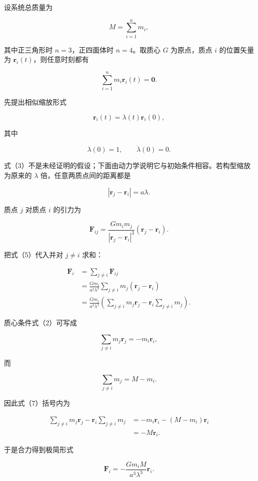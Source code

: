 \documentclass[12pt,a4paper,UTF8]{ctexart}
\begin{document}
设系统总质量为

\[
M=\sum_{i=1}^{n}m_i, \tag{1}
\]

其中正三角形时 \(n=3\)，正四面体时 \(n=4\)。取质心 \(G\) 为原点，质点
\(i\) 的位置矢量为 \(\boldsymbol r_i(t)\)，则任意时刻都有

\[
\sum_{i=1}^{n}m_i\boldsymbol r_i(t)=\boldsymbol0. \tag{2}
\]

先提出相似缩放形式

\[
\boldsymbol r_i(t)=\lambda(t)\boldsymbol r_i(0), \tag{3}
\]

其中

\[
\lambda(0)=1,\qquad \dot\lambda(0)=0. \tag{4}
\]

式（3）不是未经证明的假设；下面由动力学说明它与初始条件相容。若构型缩放为原来的
\(\lambda\) 倍，任意两质点间的距离都是

\[
|\boldsymbol r_j-\boldsymbol r_i|=a\lambda. \tag{5}
\]

质点 \(j\) 对质点 \(i\) 的引力为

\[
\boldsymbol F_{ij}
=\frac{Gm_im_j}{|\boldsymbol r_j-\boldsymbol r_i|^3}
(\boldsymbol r_j-\boldsymbol r_i). \tag{6}
\]

把式（5）代入并对 \(j\ne i\) 求和：

\[
\begin{aligned}
\boldsymbol F_i
&=\sum_{j\ne i}\boldsymbol F_{ij}\\
&=\frac{Gm_i}{a^3\lambda^3}
  \sum_{j\ne i}m_j(\boldsymbol r_j-\boldsymbol r_i)\\
&=\frac{Gm_i}{a^3\lambda^3}
  \left(
  \sum_{j\ne i}m_j\boldsymbol r_j
  -\boldsymbol r_i\sum_{j\ne i}m_j
  \right).
\end{aligned} \tag{7}
\]

质心条件式（2）可写成

\[
\sum_{j\ne i}m_j\boldsymbol r_j=-m_i\boldsymbol r_i, \tag{8}
\]

而

\[
\sum_{j\ne i}m_j=M-m_i. \tag{9}
\]

因此式（7）括号内为

\[
\begin{aligned}
\sum_{j\ne i}m_j\boldsymbol r_j
-\boldsymbol r_i\sum_{j\ne i}m_j
&=-m_i\boldsymbol r_i-(M-m_i)\boldsymbol r_i\\
&=-M\boldsymbol r_i.
\end{aligned} \tag{10}
\]

于是合力得到极简形式

\[
\boxed{
\boldsymbol F_i
=-\frac{Gm_iM}{a^3\lambda^3}\boldsymbol r_i
}. \tag{11}
\]
\end{document}

